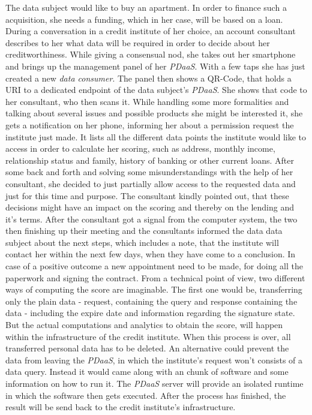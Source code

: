 \documentclass[12pt,english,a4paper,titlepage,cleardoublepage=empty,dottedtoc]{report}
\begin{document}
The data subject would like to buy an apartment. In order to finance
such a acquisition, she needs a funding, which in her case, will be
based on a loan. During a conversation in a credit institute of her
choice, an account consultant describes to her what data will be
required in order to decide about her creditworthiness. While giving a
consensual nod, she takes out her smartphone and brings up the
management panel of her \emph{PDaaS}. With a few taps she has just
created a new \emph{data consumer}. The panel then shows a QR-Code, that
holds a URI to a dedicated endpoint of the data subject's \emph{PDaaS}.
She shows that code to her consultant, who then scans it. While handling
some more formalities and talking about several issues and possible
products she might be interested it, she gets a notification on her
phone, informing her about a permission request the institute just made.
It lists all the different data points the institute would like to
access in order to calculate her scoring, such as address, monthly
income, relationship status and family, history of banking or other
current loans. After some back and forth and solving some
misunderstandings with the help of her consultant, she decided to just
partially allow access to the requested data and just for this time and
purpose. The consultant kindly pointed out, that these decisions might
have an impact on the scoring and thereby on the lending and it's terms.
After the consultant got a signal from the computer system, the two then
finishing up their meeting and the consultants informed the data data
subject about the next steps, which includes a note, that the institute
will contact her within the next few days, when they have come to a
conclusion. In case of a positive outcome a new appointment need to be
made, for doing all the paperwork and signing the contract. From a
technical point of view, two different ways of computing the score are
imaginable. The first one would be, transferring only the plain data -
request, containing the query and response containing the data -
including the expire date and information regarding the signature state.
But the actual computations and analytics to obtain the score, will
happen within the infrastructure of the credit institute. When this
process is over, all transferred personal data has to be deleted. An
alternative could prevent the data from leaving the \emph{PDaaS}, in
which the institute's request won't consists of a data query. Instead it
would came along with an chunk of software and some information on how
to run it. The \emph{PDaaS} server will provide an isolated runtime in
which the software then gets executed. After the process has finished,
the result will be send back to the credit institute's infrastructure.
\end{document}

